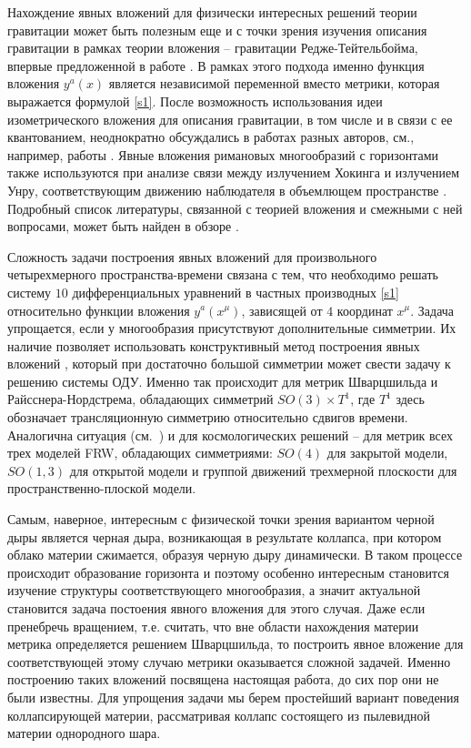 \documentclass[12pt]{article}
\begin{document}
Нахождение явных вложений для физически интересных решений теории гравитации может быть полезным
еще и с точки зрения изучения описания гравитации в рамках теории вложения -- гравитации Редже-Тейтельбойма, впервые предложенной в работе \cite{regge}.
В рамках этого подхода именно функция вложения $y^a(x)$ является независимой переменной вместо метрики,
которая выражается формулой \eqref{s1}.
После \cite{regge} возможность использования идеи изометрического вложения для описания гравитации, в том числе и в связи с ее квантованием,
неоднократно обсуждались в работах разных авторов, см., например,
работы \cite{deser,pavsic85let,tapia,davkar,statja18,rojas09,statja25,faddeev,statja51}.
Явные вложения римановых многообразий с горизонтами также используются при анализе связи между излучением Хокинга
и излучением Унру, соответствующим движению наблюдателя в объемлющем пространстве \cite{deserlev98,deserlev99,statja36}.
Подробный список литературы, связанной с теорией вложения и смежными с ней вопросами, может быть найден в обзоре \cite{tapiaob}.

Сложность задачи построения явных вложений для произвольного четырехмерного пространства-времени связана с тем, что
необходимо решать систему $10$ дифференциальных уравнений  в частных производных \eqref{s1} относительно функции вложения $y^a(x^\mu)$,
зависящей от $4$ координат $x^\mu$.
Задача упрощается, если у многообразия присутствуют дополнительные симметрии.
Их наличие позволяет использовать конструктивный метод построения явных вложений \cite{statja27}, который при
достаточно большой симметрии может свести задачу к решению системы ОДУ.
Именно так происходит для метрик Шварцшильда и Райсснера-Нордстрема, обладающих симметрий $SO(3)\times T^1$, где $T^1$ здесь обозначает трансляционную симметрию
относительно сдвигов времени. Аналогична ситуация (см.~\cite{statja29}) и для космологических решений --
для метрик всех трех моделей FRW, обладающих симметриями: $SO(4)$ для закрытой модели, $SO(1,3)$ для открытой модели
и группой движений трехмерной плоскости для пространственно-плоской модели.

Самым, наверное,  интересным с физической точки зрения вариантом черной дыры является черная дыра, возникающая в результате коллапса,
при котором облако материи сжимается, образуя черную дыру динамически. В таком процессе происходит образование горизонта
и поэтому особенно интересным становится изучение структуры соответствующего многообразия, а значит актуальной становится
задача постоения явного вложения для этого случая.
Даже если пренебречь вращением, т.е. считать, что вне области нахождения материи метрика определяется
решением Шварцшильда, то построить явное вложение для соответствующей этому случаю метрики оказывается
сложной задачей. Именно построению таких вложений посвящена настоящая работа, до сих пор они не были известны.
Для упрощения задачи мы берем простейший вариант поведения коллапсирующей материи, рассматривая коллапс
состоящего из пылевидной материи однородного шара.
\end{document}
